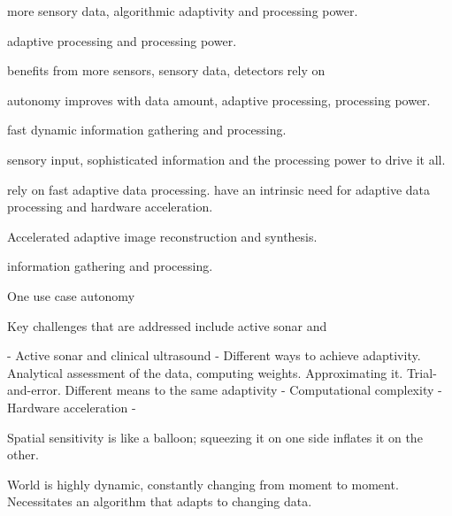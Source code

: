 more sensory data, algorithmic adaptivity and processing power.

adaptive processing and processing power. 

benefits from more sensors, sensory data,   detectors rely on 

autonomy improves with data amount, adaptive processing, processing power.

fast dynamic information gathering and processing. 


sensory input, sophisticated information and the processing power to drive it all. 

rely on fast adaptive data processing. have an intrinsic need for adaptive data processing and hardware acceleration. 

Accelerated adaptive image reconstruction and synthesis. 

information gathering and processing. 

One use case autonomy

Key challenges that are addressed include active sonar and

- Active sonar and clinical ultrasound
- Different ways to achieve adaptivity. Analytical assessment of the data, computing weights. Approximating it. Trial-and-error. Different means to the same adaptivity
- Computational complexity
- Hardware acceleration
- 

Spatial sensitivity is like a balloon; squeezing it on one side inflates it on the other. 

World is highly dynamic, constantly changing from moment to moment. Necessitates an algorithm that adapts to changing data. 



